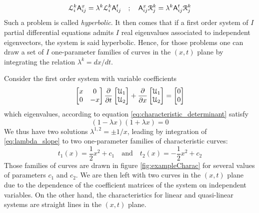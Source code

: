 \begin{equation}
  \label{eq:eigenvectors}
  \mathcal{L}^k_i  \mathsf{A}^x_{ij} = \lambda^k \mathcal{L}^k_i \mathsf{A}^t_{ij} \quad ; \quad \mathsf{A}^x_{ij}\mathcal{R}^k_j = \lambda^k \mathsf{A}^t_{ij}\mathcal{R}^k_j
\end{equation}
Such a problem is called \textit{hyperbolic}. It then comes that if a first order system of $I$ partial differential equations admits $I$ real eigenvalues associated to independent eigenvectors, the system is said hyperbolic. Hence, for those problems one can draw a set of $I$ one-parameter families of curves in the $(x,t)$ plane by integrating the relation $\lambda^k=dx/dt$.
\begin{example}
  \label{ex:charac1}
  Consider the first order system with variable coefficients
\begin{equation*}
 \left[\begin{matrix}x &0 \\0 &-x\end{matrix}\right] \frac{\partial }{\partial t} \left[\begin{matrix}\mathcal{U}_1 \\ \mathcal{U}_2\end{matrix}\right] + \frac{\partial }{\partial x}\left[\begin{matrix}\mathcal{U}_1 \\ \mathcal{U}_2\end{matrix}\right] = \left[\begin{matrix}0 \\0\end{matrix}\right]
\end{equation*}
which eigenvalues, according to equation \eqref{eq:characteristic_determinant} satisfy
\begin{equation*}
  (1-\lambda x)(1+\lambda x)=0
\end{equation*}
We thus have two solutions $\lambda^{1,2}=\pm 1/x$, leading by integration of \eqref{eq:lambda_slope} to two one-parameter families of characteristic curves:
\begin{equation*}
  t_1(x)=\frac{1}{2}x^2+c_1  \quad \text{and} \quad t_2(x)=-\frac{1}{2}x^2+c_2 
\end{equation*}
Those families of curves are drawn in figure \ref{fig:exampleCharac} for several values of parameters $c_1$ and $c_2$. We are then left with two curves in the $(x,t)$ plane due to the dependence of the coefficient matrices of the system on independent variables. On the other hand, the characteristics for linear and quasi-linear systems are straight lines in the $(x,t)$ plane.
\end{example}
